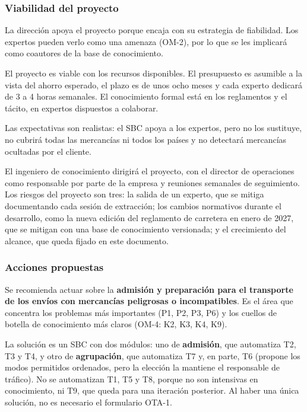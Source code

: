 \documentclass[12pt,a4paper,twoside,spanish]{article}      %
\begin{document}
\subsubsection{Viabilidad del proyecto}

La dirección apoya el proyecto porque encaja con su estrategia de fiabilidad. Los expertos pueden verlo como una amenaza (OM-2), por lo que se les implicará como coautores de la base de conocimiento.

El proyecto es viable con los recursos disponibles. El presupuesto es asumible a la vista del ahorro esperado, el plazo es de unos ocho meses y cada experto dedicará de 3 a 4 horas semanales. El conocimiento formal está en los reglamentos y el tácito, en expertos dispuestos a colaborar.

Las expectativas son realistas: el SBC apoya a los expertos, pero no los sustituye, no cubrirá todas las mercancías ni todos los países y no detectará mercancías ocultadas por el cliente.

El ingeniero de conocimiento dirigirá el proyecto, con el director de operaciones como responsable por parte de la empresa y reuniones semanales de seguimiento. Los riesgos del proyecto son tres: la salida de un experto, que se mitiga documentando cada sesión de extracción; los cambios normativos durante el desarrollo, como la nueva edición del reglamento de carretera en enero de 2027, que se mitigan con una base de conocimiento versionada; y el crecimiento del alcance, que queda fijado en este documento.

\subsubsection{Acciones propuestas}

Se recomienda actuar sobre la \textbf{admisión y preparación para el transporte de los envíos con mercancías peligrosas o incompatibles}. Es el área que concentra los problemas más importantes (P1, P2, P3, P6) y los cuellos de botella de conocimiento más claros (OM-4: K2, K3, K4, K9).

La solución es un SBC con dos módulos: uno de \textbf{admisión}, que automatiza T2, T3 y T4, y otro de \textbf{agrupación}, que automatiza T7 y, en parte, T6 (propone los modos permitidos ordenados, pero la elección la mantiene el responsable de tráfico). No se automatizan T1, T5 y T8, porque no son intensivas en conocimiento, ni T9, que queda para una iteración posterior. Al haber una única solución, no es necesario el formulario OTA-1.
\end{document}
